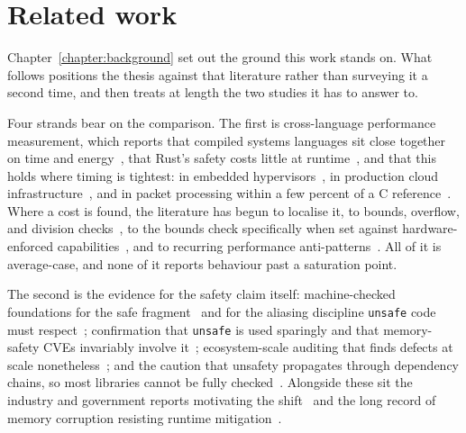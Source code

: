 \documentclass[english,twoside,openright,a4paper,censored,csm,software-track-2020]{HYthesisML}
\begin{document}
\section{Related work}\label{sec:relatedwork}
Chapter~\ref{chapter:background} set out the ground this work stands on. What follows positions
the thesis against that literature rather than surveying it a second time, and then treats at
length the two studies it has to answer to.

Four strands bear on the comparison. The first is cross-language performance measurement, which
reports that compiled systems languages sit close together on time and
energy~\cite{pereira2017energy,bugden2022rust}, that Rust's safety costs little at
runtime~\cite{balasubramanian2017rust,levy2017kernel}, and that this holds where timing is
tightest: in embedded hypervisors~\cite{mo2023rustshyper}, in production cloud
infrastructure~\cite{agache2020firecracker}, and in packet processing within a few percent of a
C reference~\cite{emmerich2019drivers,xiao2024rpkt}. Where a cost is found, the literature has
begun to localise it, to bounds, overflow, and division checks~\cite{zhang2022runtime}, to the
bounds check specifically when set against hardware-enforced
capabilities~\cite{harris2023morello}, and to recurring performance
anti-patterns~\cite{cui2025perfbugs}. All of it is average-case, and none of it reports
behaviour past a saturation point.

The second is the evidence for the safety claim itself: machine-checked foundations for the safe
fragment~\cite{jung2018rustbelt,jung2021safe} and for the aliasing discipline \texttt{unsafe}
code must respect~\cite{jung2020stacked}; confirmation that \texttt{unsafe} is used sparingly and
that memory-safety CVEs invariably involve
it~\cite{astrauskas2020unsafe,qin2020rust,xu2021rustcve}; ecosystem-scale auditing that finds
defects at scale nonetheless~\cite{bae2021rudra,zheng2024security,qin2024safety}; and the caution
that unsafety propagates through dependency chains, so most libraries cannot be fully
checked~\cite{evans2020rust}. Alongside these sit the industry and government reports motivating
the shift~\cite{msrc2019memory,google2022android,cisa2023memorysafe,oncd2024building,google2024securebydesign}
and the long record of memory corruption resisting runtime mitigation~\cite{szekeres2013sok}.
\end{document}
